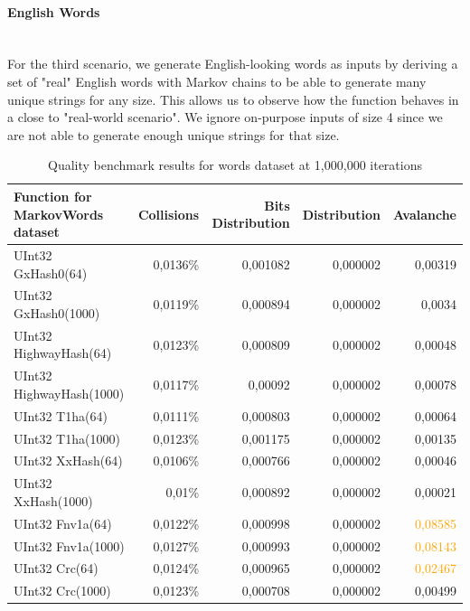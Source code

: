 \documentclass[10pt]{article}
\begin{document}
\clearpage
\paragraph{English Words}\leavevmode\\
For the third scenario, we generate English-looking words as inputs by deriving a set of "real" English words with Markov chains to be able to generate many unique strings for any size. This allows us to observe how the function behaves in a close to "real-world scenario". We ignore on-purpose inputs of size 4 since we are not able to generate enough unique strings for that size.

\begin{table}[H]
\centering
\begin{tabular}{|l|r|r|r|r|}
\hline
\textbf{Function for MarkovWords dataset} & \textbf{Collisions} & \textbf{Bits Distribution} & \textbf{Distribution} & \textbf{Avalanche} \\
\hline
UInt32 GxHash0(64)                & 0,0136\% & 0,001082  & 0,000002 & 0,00319 \\
UInt32 GxHash0(1000)              & 0,0119\% & 0,000894  & 0,000002 & 0,0034 \\
UInt32 HighwayHash(64)            & 0,0123\% & 0,000809  & 0,000002 & 0,00048 \\
UInt32 HighwayHash(1000)          & 0,0117\% & 0,00092   & 0,000002 & 0,00078 \\
UInt32 T1ha(64)                   & 0,0111\% & 0,000803  & 0,000002 & 0,00064 \\
UInt32 T1ha(1000)                 & 0,0123\% & 0,001175  & 0,000002 & 0,00135 \\
UInt32 XxHash(64)                & 0,0106\% & 0,000766  & 0,000002 & 0,00046 \\
UInt32 XxHash(1000)              & 0,01\%   & 0,000892  & 0,000002 & 0,00021 \\
UInt32 Fnv1a(64)                 & 0,0122\% & 0,000998  & 0,000002 & \textcolor{orange}{0,08585} \\
UInt32 Fnv1a(1000)               & 0,0127\% & 0,000993  & 0,000002 & \textcolor{orange}{0,08143} \\
UInt32 Crc(64)                   & 0,0124\% & 0,000965  & 0,000002 & \textcolor{orange}{0,02467} \\
UInt32 Crc(1000)                 & 0,0123\% & 0,000708  & 0,000002 & 0,00499 \\
\hline
\end{tabular}
\caption{Quality benchmark results for words dataset at 1,000,000 iterations}
\label{tab:my_label}
\end{table}
\end{document}
